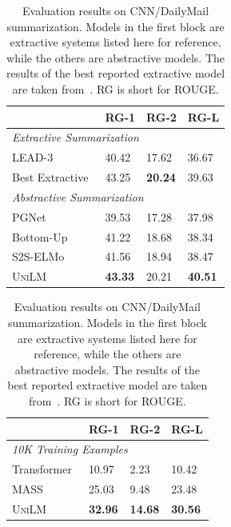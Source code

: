 \documentclass{article}
\newcommand\ours{\textsc{UniLM}}
\begin{document}
\begin{table}[t]
\centering
\small
\begin{minipage}{2.7in}
\centering
\begin{tabular}{@{\hskip6pt}l@{\hskip6pt} @{\hskip6pt}l@{\hskip6pt} @{\hskip6pt}l@{\hskip6pt} @{\hskip6pt}l@{\hskip6pt}}
\toprule
                & RG-1       & RG-2        & RG-L  
                \\ \midrule
\multicolumn{4}{l}{\emph{Extractive Summarization}} \\
\quad LEAD-3 & 40.42           & 17.62   & 36.67 \\
\quad Best Extractive~\cite{bertsum} & 43.25 & \textbf{20.24} & 39.63 \\
\midrule
\multicolumn{4}{l}{\emph{Abstractive Summarization}} \\
\quad PGNet~\cite{see-etal-2017-get}   & 39.53 & 17.28 & 37.98  \\
\quad Bottom-Up~\cite{gehrmann-etal-2018-bottom}   & 41.22            & 18.68           & 38.34  \\ 
\quad S2S-ELMo~\cite{Edunov2019PretrainedLM}   & 41.56 & 18.94           &   38.47   \\
\quad \ours & \textbf{43.33} & 20.21 & \textbf{40.51} \\
\bottomrule
\end{tabular}
\normalsize
\caption{Evaluation results on CNN/DailyMail summarization. Models in the first block are extractive systems listed here for reference, while the others are abstractive models. The results of the best reported extractive model are taken from~\cite{bertsum}. RG is short for ROUGE.}
\label{tbl:summary:result}
\end{minipage}
\hfill
\begin{minipage}{2.7in}
\centering
\begin{tabular}{@{\hskip6pt}l@{\hskip6pt} @{\hskip6pt}l@{\hskip6pt} @{\hskip6pt}l@{\hskip6pt} @{\hskip6pt}l@{\hskip6pt}}
\toprule
                & RG-1       & RG-2        & RG-L  
                \\ \midrule
\multicolumn{4}{l}{\emph{10K Training Examples}} \\
\quad Transformer~\cite{transformer}   & 10.97 & 2.23 & 10.42 \\
\quad MASS~\cite{mass} & 25.03 & 9.48 & 23.48 \\
\quad \ours & \textbf{32.96} & \textbf{14.68} & \textbf{30.56} \\

\end{tabular}
\end{minipage}
\end{table}
\end{document}
